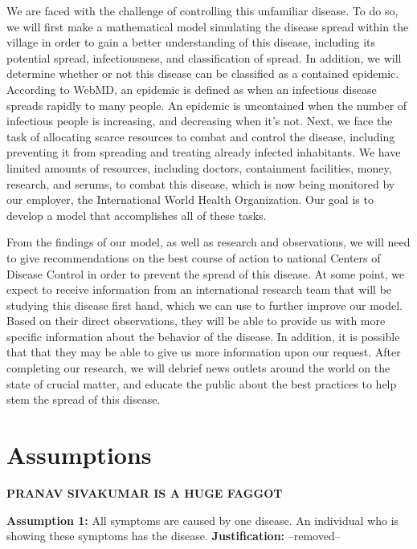 \documentclass[11pt]{article}
\begin{document}
We are faced with the challenge of controlling this unfamiliar disease. To do so, we will first make a mathematical model simulating the disease spread within the village in order to gain a better understanding of this disease, including its potential spread, infectiousness, and classification of spread. In addition, we will determine whether or not this disease can be classified as a contained epidemic. According to WebMD, an epidemic is defined as when an infectious disease spreads rapidly to many people. An epidemic is uncontained when the number of infectious people is increasing, and decreasing when it’s not. Next, we face the task of allocating scarce resources to combat and control the disease, including preventing it from spreading and treating already infected inhabitants. We have limited amounts of resources, including doctors, containment facilities, money, research, and serums, to combat this disease, which is now being monitored by our employer, the International World Health Organization. Our goal is to develop a model that accomplishes all of these tasks.

From the findings of our model, as well as research and observations, we will need to give recommendations on the best course of action to national Centers of Disease Control in order to prevent the spread of this disease. At some point, we expect to receive information from an international research team that will be studying this disease first hand, which we can use to further improve our model. Based on their direct observations, they will be able to provide us with more specific information about the behavior of the disease. In addition, it is possible that that they may be able to give us more information upon our request. After completing our research, we will debrief news outlets around the world on the state of crucial matter, and educate the public about the best practices to help stem the spread of this disease.

\newpage
\section{Assumptions}

\textbf{PRANAV SIVAKUMAR IS A HUGE FAGGOT}

\textbf{Assumption 1:} All symptoms are caused by one disease. An individual who is showing these symptoms has the disease.
\newline
\textbf{Justification:} --removed--
\end{document}
